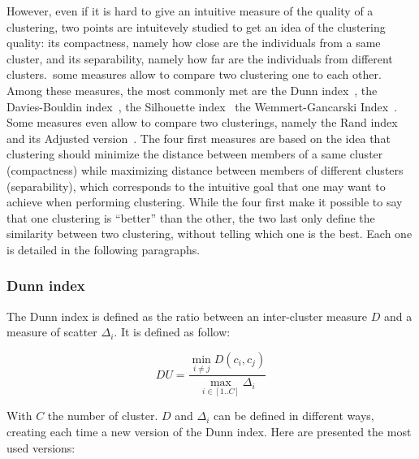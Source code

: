\documentclass[a4paper]{report}
\begin{document}
    However, even if it is hard to give an intuitive measure of the quality of a clustering, two points are intuitevely studied to get an idea of the clustering quality: its compactness, namely how close are the individuals from a same cluster, and its separability, namely how far are the individuals from different clusters.\ some measures allow to compare two clustering one to each other. Among these measures, the most commonly met are the Dunn index~\cite{dunn1973fuzzy}, the Davies-Bouldin index~\cite{davies1979cluster}, the Silhouette index~\cite{rousseeuw1987silhouettes} the Wemmert-Gancarski Index~\cite{wemmert2000classification}. Some measures even allow to compare two clusterings, namely the Rand index~\cite{rand1971objective} and its Adjusted version~\cite{hubert1985comparing}. The four first measures are based on the idea that clustering should minimize the distance between members of a same cluster (compactness) while maximizing distance between members of different clusters (separability), which corresponds to the intuitive goal that one may want to achieve when performing clustering.  While the four first make it possible to say that one clustering is ``better'' than the other, the two last only define the similarity between two clustering, without telling which one is the best. Each one is detailed in the following paragraphs.

    \subsubsection{Dunn index}
    The Dunn index is defined as the ratio between an inter-cluster measure $D$ and a measure of scatter $\Delta_i$. It is defined as follow:

    \begin{equation}
        DU = \frac{\min\limits_{i \neq j}D(c_i, c_j)}{\max\limits_{i \in [1..C]} \Delta_i}
        \label{eq:du_index}
    \end{equation}

    With $C$ the number of cluster. $D$ and $\Delta_i$ can be defined in different ways, creating each time a new version of the Dunn index. Here are presented the most used versions:

    \vspace{0.8cm}
\end{document}
